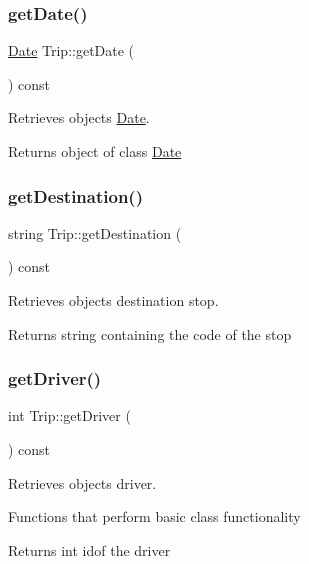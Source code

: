 \subsubsection{\texorpdfstring{get\+Date()}{getDate()}}
{\footnotesize\ttfamily \hyperlink{class_date}{Date} Trip\+::get\+Date (\begin{DoxyParamCaption}{ }\end{DoxyParamCaption}) const}



Retrieves object\textquotesingle{}s \hyperlink{class_date}{Date}. 

\begin{DoxyReturn}{Returns}
object of class \hyperlink{class_date}{Date} 
\end{DoxyReturn}
\mbox{\label{group___trip_ga576ad0d4c7a723aa4b2d12ebdd4eec99}} 
\subsubsection{\texorpdfstring{get\+Destination()}{getDestination()}}
{\footnotesize\ttfamily string Trip\+::get\+Destination (\begin{DoxyParamCaption}{ }\end{DoxyParamCaption}) const}



Retrieves object\textquotesingle{}s destination stop. 

\begin{DoxyReturn}{Returns}
string containing the code of the stop 
\end{DoxyReturn}
\mbox{\label{group___trip_gabc996cddbc65b41987dd8d4d9776c729}} 
\subsubsection{\texorpdfstring{get\+Driver()}{getDriver()}}
{\footnotesize\ttfamily int Trip\+::get\+Driver (\begin{DoxyParamCaption}{ }\end{DoxyParamCaption}) const}



Retrieves object\textquotesingle{}s driver. 

Functions that perform basic class functionality \begin{DoxyReturn}{Returns}
int idof the driver 
\end{DoxyReturn}
\mbox{\label{group___trip_ga6ed6b87b4206efe21fe2c6744c73061b}} 
